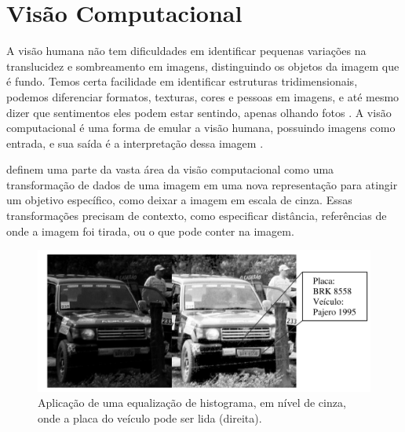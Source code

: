 \section{Visão Computacional}

A visão humana não tem dificuldades em identificar pequenas variações na translucidez e sombreamento em imagens, distinguindo os objetos da imagem que é fundo. Temos certa facilidade em identificar estruturas tridimensionais, podemos diferenciar formatos, texturas, cores e pessoas em imagens, e até mesmo dizer que sentimentos eles podem estar sentindo, apenas olhando fotos \cite{szeliski2010computer}.
% 
A visão computacional é uma forma de emular a visão humana, possuindo imagens como entrada, e sua saída é a interpretação dessa imagem \cite{marengoni:2009}.

 definem uma parte da vasta área da visão computacional como uma transformação de dados de uma imagem em uma nova representação para atingir um objetivo específico, como deixar a imagem em escala de cinza. Essas transformações precisam de contexto, como especificar distância, referências de onde a imagem foi tirada, ou o que pode conter na imagem.
\begin{figure}[h]
	\caption{\label{fig:grayscaleex}Aplicação de uma equalização de histograma, em nível de cinza, onde a placa do veículo pode ser lida (direita).}
	\begin{center}
	    \includegraphics[width=.7\textwidth]{resources/grayscaleex}
	\end{center}
\end{figure}


